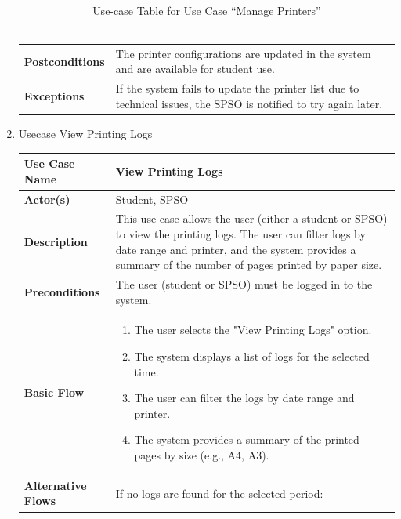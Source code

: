 \begin{enumerate}
\begin{table}[h!]
\begin{tabular}{|>{\centering\arraybackslash}m{3cm}|>{\raggedright\arraybackslash}m{10cm}|}
\begin{enumerate}
            \end{enumerate} \\ \hline
            \textbf{Postconditions} & The printer configurations are updated in the system and are available for student use. \\ \hline
            \textbf{Exceptions} & If the system fails to update the printer list due to technical issues, the SPSO is notified to try again later. \\ [2ex] \hline
            \end{tabular}
            \caption{Use-case Table for Use Case “Manage Printers”}
            \label{tab:manage_printers_use_case}
        \end{table}

    \newpage
    \item Usecase View Printing Logs
        \begin{table}[h!]
            \centering
            \renewcommand{\arraystretch}{1.8}
            \begin{tabular}{|>{\centering\arraybackslash}m{3cm}|>{\raggedright\arraybackslash}m{10cm}|}
            \hline
            \textbf{Use Case Name} & View Printing Logs \\ \hline
            \textbf{Actor(s)} & Student, SPSO \\ \hline
            \textbf{Description} & This use case allows the user (either a student or SPSO) to view the printing logs. The user can filter logs by date range and printer, and the system provides a summary of the number of pages printed by paper size. \\ \hline
            \textbf{Preconditions} & The user (student or SPSO) must be logged in to the system. \\ \hline
            \textbf{Basic Flow} & 
            \begin{enumerate}
                \item The user selects the "View Printing Logs" option.
                \item The system displays a list of logs for the selected time.
                \item The user can filter the logs by date range and printer.
                \item The system provides a summary of the printed pages by size (e.g., A4, A3).
            \end{enumerate} \\ \hline
            \textbf{Alternative Flows} & 
            If no logs are found for the selected period:

\end{tabular}
\end{table}
\end{enumerate}
